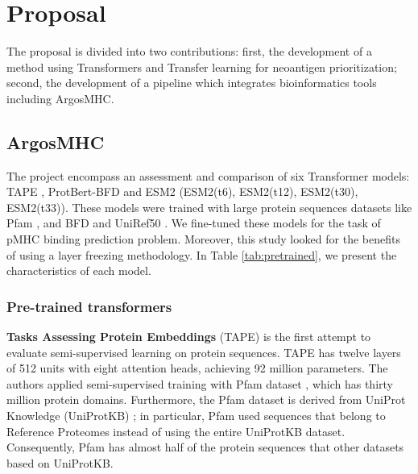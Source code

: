\section{Proposal}

The proposal is divided into two contributions: first, the development of a method using Transformers and Transfer learning for neoantigen prioritization; second, the development of a pipeline which integrates bioinformatics tools including ArgosMHC.

\subsection{ArgosMHC}

The project encompass an assessment and comparison of six Transformer models: TAPE \cite{rao2019evaluating}, ProtBert-BFD \cite{elnaggar2021prottrans} and ESM2 \cite{lin2023evolutionary} (ESM2(t6), ESM2(t12), ESM2(t30), ESM2(t33)). These models were trained with large protein sequences datasets like Pfam \cite{el2019pfam}, and BFD and UniRef50  \cite{suzek2015uniref}. We fine-tuned these models for the task of pMHC binding prediction problem. Moreover, this study looked for the benefits of using a layer freezing methodology.  In Table \ref{tab:pretrained}, we present the characteristics of each model.


\subsubsection{Pre-trained transformers}

\textbf{Tasks Assessing Protein Embeddings} (TAPE) \cite{rao2019evaluating} is the first attempt to evaluate semi-supervised learning on protein sequences. TAPE has twelve layers of 512 units with eight attention heads, achieving 92 million parameters. The authors applied semi-supervised training with Pfam dataset \cite{el2019pfam}, which has thirty million protein domains. Furthermore, the Pfam dataset is derived from UniProt Knowledge (UniProtKB) \cite{uniprot2018uniprot}; in particular, Pfam used sequences that belong to Reference Proteomes \cite{finn2016pfam} instead of using the entire UniProtKB dataset. Consequently, Pfam has almost half of the protein sequences that other datasets based on UniProtKB. 



